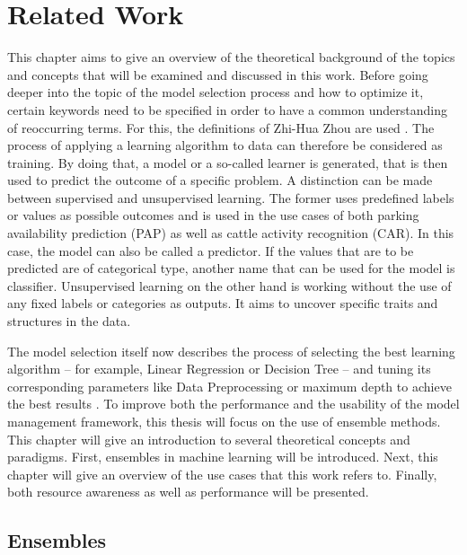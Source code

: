 \chapter{Related Work} \label{chap:relatedwork}

This chapter aims to give an overview of the theoretical background of the topics and concepts that will be examined and discussed in this work. Before going deeper into the topic of the model selection process and how to optimize it, certain keywords need to be specified in order to have a common understanding of reoccurring terms. For this, the definitions of Zhi-Hua Zhou are used \cite{zhou2012}. The process of applying a learning algorithm to data can therefore be considered as training. By doing that, a model or a so-called learner is generated, that is then used to predict the outcome of a specific problem. A distinction can be made between supervised and unsupervised learning. The former uses predefined labels or values as possible outcomes and is used in the use cases of both parking availability prediction (PAP) as well as cattle activity recognition (CAR). In this case, the model can also be called a predictor. If the values that are to be predicted are of categorical type, another name that can be used for the model is classifier. Unsupervised learning on the other hand is working without the use of any fixed labels or categories as outputs. It aims to uncover specific traits and structures in the data.

The model selection itself now describes the process of selecting the best learning algorithm – for example, Linear Regression or Decision Tree – and tuning its corresponding parameters like Data Preprocessing or maximum depth to achieve the best results \cite{zhou2012}. To improve both the performance and the usability of the model management framework, this thesis will focus on the use of ensemble methods. This chapter will give an introduction to several theoretical concepts and paradigms. First, ensembles in machine learning will be introduced. Next, this chapter will give an overview of the use cases that this work refers to. Finally, both resource awareness as well as performance will be presented.


\section{Ensembles} \label{ensembles}


